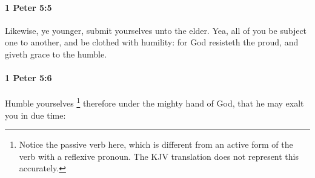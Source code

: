 		\paragraph{1 Peter 5:5} %
			\label{1PETER-5-5}

			Likewise, ye younger, submit yourselves unto the elder.  Yea, all of you be subject one to another, and be clothed with humility: for God resisteth the proud, and giveth grace to the humble.

			\begin{framed}
			\scriptsize
				\begin{compactdesc}
					\item[SBLG] 
				\end{compactdesc}
			\end{framed}

		\paragraph{1 Peter 5:6} %
			\label{1PETER-5-6}

			Humble yourselves%
				\footnote{%
					Notice the passive verb here, which is different from an active form of the verb with a reflexive pronoun. The KJV translation does not represent this accurately.
					} 
			therefore under the mighty hand of God, that he may exalt you in due time:

